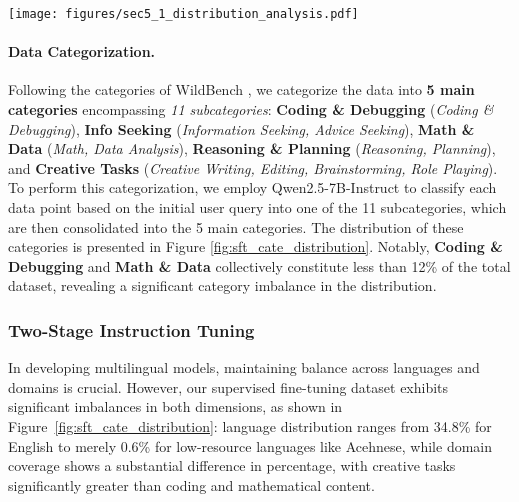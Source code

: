 \begin{figure*}
\centering
\begin{minipage}[b]{\textwidth}
\centering
\texttt{[image: figures/sec5\_1\_distribution\_analysis.pdf]}
\end{minipage}
\label{fig:sft_cate_distribution}
\end{figure*}
\vspace{-2mm}

\paragraph{Data Categorization.}
Following the categories of WildBench \citep{lin2024wildbenchbenchmarkingllmschallenging}, we categorize the data into \textbf{5 main categories} encompassing \textit{11 subcategories}: \textbf{Coding \& Debugging} (\textit{Coding \& Debugging}), \textbf{Info Seeking} (\textit{Information Seeking, Advice Seeking}), \textbf{Math \& Data} (\textit{Math, Data Analysis}), \textbf{Reasoning \& Planning} (\textit{Reasoning, Planning}), and \textbf{Creative Tasks} (\textit{Creative Writing, Editing, Brainstorming, Role Playing}). 
To perform this categorization, we employ Qwen2.5-7B-Instruct to classify each data point based on the initial user query into one of the 11 subcategories, which are then consolidated into the 5 main categories.
The distribution of these categories is presented in Figure \ref{fig:sft_cate_distribution}. Notably, \textbf{Coding \& Debugging} and \textbf{Math \& Data} collectively constitute less than 12\% of the total dataset, revealing a significant category imbalance in the distribution.


\subsubsection{Two-Stage Instruction Tuning}

In developing multilingual models, maintaining balance across languages and domains is crucial. However, our supervised fine-tuning dataset exhibits significant imbalances in both dimensions, as shown in Figure~\ref{fig:sft_cate_distribution}: language distribution ranges from 34.8\% for English to merely 0.6\% for low-resource languages like Acehnese, while domain coverage shows a substantial difference in percentage, with creative tasks significantly greater than coding and mathematical content.

